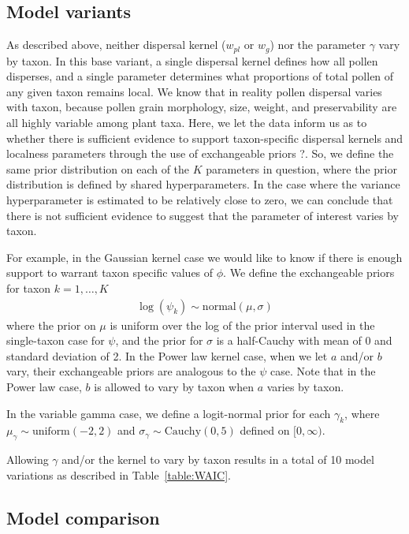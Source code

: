 \documentclass[12pt]{article}
\begin{document}
\subsection{Model variants}

As described above, neither dispersal kernel ($w_{pl}$ or $w_g$) nor
the parameter $\gamma$ vary by taxon. In this base variant, a single
dispersal kernel defines how all pollen disperses, and a single
parameter determines what proportions of total pollen of any given
taxon remains local. We know that in reality pollen dispersal varies
with taxon, because pollen grain morphology, size, weight, and
preservability are all highly variable among plant taxa. Here, we let
the data inform us as to whether there is sufficient evidence to
support taxon-specific dispersal kernels and localness parameters
through the use of exchangeable priors ?. So, we define the same prior
distribution on each of the $K$ parameters in question, where the prior
distribution is defined by shared hyperparameters. In the case where
the variance hyperparameter is estimated to be relatively close to
zero, we can conclude that there is not sufficient evidence to suggest
that the parameter of interest varies by taxon.

For example, in the Gaussian kernel case we would like to know
if there is enough support to warrant taxon specific values of
$\phi$. We define the exchangeable priors for taxon $k=1, \ldots, K$
\begin{align}
\log(\psi_k) \sim \text{normal}( \mu, \sigma)
\end{align}
where the prior on $\mu$ is uniform over the log of the prior interval
used in the single-taxon case for $\psi$, and the prior for $\sigma$
is a half-Cauchy with mean of 0 and standard deviation of 2. In the
Power law kernel case, when we let $a$ and/or $b$ vary, their
exchangeable priors are analogous to the $\psi$ case. Note that in the
Power law case, $b$ is allowed to vary by taxon when $a$ varies by taxon.

In the variable gamma case, we define a logit-normal prior for each
$\gamma_k$, where $\mu_{\gamma} \sim \text{uniform}(-2, 2)$ and $\sigma_{\gamma}
\sim \text{Cauchy}(0,5)$ defined on $[0,\infty)$.

Allowing $\gamma$ and/or the kernel to vary by taxon results in a
total of 10 model variations as described in Table~\ref{table:WAIC}.

\subsection{Model comparison}
\end{document}
